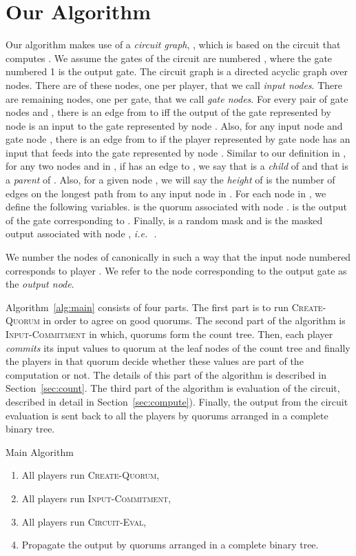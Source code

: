 \documentclass[10pt]{llncs}
\newcommand{\ie}{\emph{i.e.\,}}
\newcommand{\cq}{\textsc{Create-Quorum}\xspace}
\newcommand{\ic}{\textsc{Input-Commitment}\xspace}
\newcommand{\ce}{\textsc{Circuit-Eval}\xspace}
\newcommand{\outnode}{output node}
\newcommand{\ct}{count tree\xspace}
\begin{document}
\section{Our Algorithm} \label{sec:alg}
Our algorithm makes use of a \emph{circuit graph}, , which is based
on the circuit  that computes . We assume the gates of the
circuit  are numbered , where the gate numbered 1
is the output gate. The circuit graph is a directed acyclic graph over
 nodes.  There are  of these nodes, one per player, that we
call \emph{input nodes}.  There are  remaining nodes, one per gate,
that we call \emph{gate nodes}. For every pair of gate nodes  and
, there is an edge from  to  iff the output of the gate
represented by node  is an input to the gate represented by node
.  Also, for any input node  and gate node , there is an edge
from  to  if the player represented by gate node  has an
input that feeds into the gate represented by node . Similar to our
definition in , for any two nodes  and  in , if  has an
edge to , we say that  is a \emph{child} of  and that  is
a \emph{parent} of .  Also, for a given node , we will say the
\emph{height} of  is the number of edges on the longest path from
 to any input node in . For each node in , we define the following variables.  is the quorum associated with node .  is the output of the gate corresponding to . Finally,  is a random mask and  is the masked output associated with node , \ie ~.

We number the nodes of  canonically in such a way that the input node numbered 
corresponds to player . We refer to the node corresponding to the
output gate as the \emph{\outnode}.

Algorithm~\ref{alg:main} consists of four parts. The first part is to
run \cq in order to agree on  good quorums. The second part of the
algorithm is \ic in which, quorums form the \ct. Then, each player
 \emph{commits} its input values to quorum  at the leaf nodes
of the \ct and finally the players in that quorum decide whether these
values are part of the computation or not. The details of this part of
the algorithm is described in Section~\ref{sec:count}. The third part
of the algorithm is evaluation of the circuit, described in detail in
Section~\ref{sec:compute}). Finally, the output from the circuit
evaluation is sent back to all the players by quorums arranged in a complete 
binary tree.

\begin{algorithm}
\caption{Main Algorithm}\label{alg:main}
\begin{enumerate}
\item All players run \cq,
\item All players run \ic,
\item All players run \ce,
\item Propagate the output by quorums arranged in a complete binary tree.
\end{enumerate}
\end{algorithm} 
\end{document}

